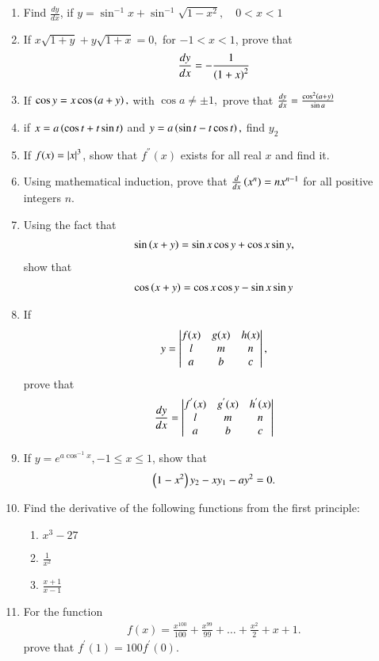 \begin{enumerate}[label=\arabic*.,ref=\thesubsection.\theenumi]
\item Find $\frac{dy}{dx}$, if 
$
y = \sin ^{-1}x + \sin^{-1}\sqrt{1-x^2}, \quad 0 < x < 1
$
\item If 
$
x\sqrt{1+y}+y\sqrt{1+x} = 0,
$
for $-1<x<1$, prove that
%
\begin{align}
\frac{dy}{dx} = -\frac{1}{\left(1+x\right)^2}
\end{align}
\item If
$
\cos y = x \cos\left(a+y\right), 
$
with 
$
\cos a \ne \pm 1,
$
prove that 
$
\frac{dy}{dx}= \frac{\cos^2\left(a+y\right)}{\sin a}
$
\item if 
$
x = a \left(\cos t + t\sin t\right)
$
and
$
y = a \left(\sin t - t\cos t \right), 
$
find $y_2$
\item If $f(x) =\left\vert x\right\vert^3$, show that $f^{''}(x)$ exists for all real $x$ and find it.
\item Using mathematical induction, prove that $\frac{d}{dx}\left(x^n\right) = nx^{n-1}$ for all positive integers $n$.
\item Using the fact that 
\begin{align}
\sin\left(x+y\right) = \sin x \cos y +\cos x \sin y,
\end{align}
%
show that 
\begin{align}
\cos\left(x+y\right) = \cos x \cos y -\sin x \sin y
\end{align}
\item If 
\begin{align}
y = 
\begin{vmatrix}
f(x) & g(x) & h(x)
\\
l &m & n
\\
a & b & c
\end{vmatrix},
\end{align}
%
prove that 
\begin{align}
\frac{dy}{dx} = 
\begin{vmatrix}
f^{'}(x) & g^{'}(x) & h^{'}(x)
\\
l &m & n
\\
a & b & c
\end{vmatrix}
\end{align}
\item If $y = e^{a\cos^{-1}x}, - 1 \le x \le 1$, show that 
\begin{align}
\left(1-x^2\right)y_2-xy_1-ay^2 = 0.
\end{align}
%
\item Find the derivative of the following functions from the first principle:
%
\begin{enumerate}
\item  $x^3-27$
\item  $\frac{1}{x^2}$
\item  $\frac{x+1}{x-1}$
\end{enumerate}
%
\item For the function 
\begin{align}
f(x) = \frac{x^100}{100} + \frac{x^99}{99} + \dots + \frac{x^2}{2} + x + 1.
\end{align}
%
prove that $f^{'}(1) = 100f^{'}(0) $.

\end{enumerate}
